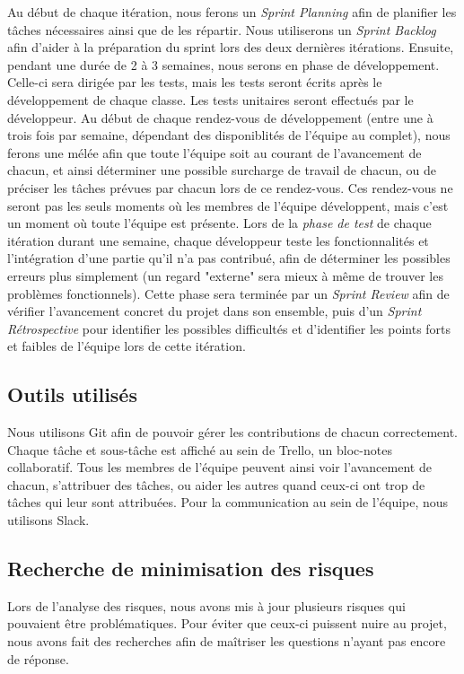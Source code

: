 \documentclass[hidelinks, 10pt,a4paper]{article}
\begin{document}
Au début de chaque itération, nous ferons un \emph{Sprint Planning} afin de planifier
les tâches nécessaires ainsi que de les répartir. Nous utiliserons un \emph{Sprint Backlog}
afin d'aider à la préparation du sprint lors des deux dernières itérations.
Ensuite, pendant une durée de 2 à 3 semaines, nous serons en phase de développement.
Celle-ci sera dirigée par les tests, mais les tests seront écrits après le développement
de chaque classe. Les tests unitaires seront effectués par le développeur.
Au début de chaque rendez-vous de développement (entre une à trois fois par semaine,
dépendant des disponiblités de l'équipe au complet), nous ferons une mélée afin que toute
l'équipe soit au courant de l'avancement de chacun, et ainsi déterminer une possible surcharge
de travail de chacun, ou de préciser les tâches prévues par chacun lors de ce rendez-vous.
Ces rendez-vous ne seront pas les seuls moments où les membres de l'équipe développent, mais
c'est un moment où toute l'équipe est présente.
Lors de la \emph{phase de test} de chaque itération durant une semaine, chaque développeur
teste les fonctionnalités et l'intégration d'une partie qu'il n'a pas contribué, afin de
déterminer les possibles erreurs plus simplement (un regard "externe" sera mieux à même
de trouver les problèmes fonctionnels). Cette phase sera terminée par un \emph{Sprint Review}
afin de vérifier l'avancement concret du projet dans son ensemble, puis d'un \emph{Sprint Rétrospective}
pour identifier les possibles difficultés et d'identifier les points forts et faibles de l'équipe
lors de cette itération.

\subsection{Outils utilisés}
Nous utilisons Git afin de pouvoir gérer les contributions de chacun correctement.
Chaque tâche et sous-tâche est affiché au sein de Trello, un bloc-notes collaboratif.
Tous les membres de l'équipe peuvent ainsi voir l'avancement de chacun, s'attribuer
des tâches, ou aider les autres quand ceux-ci ont trop de tâches qui leur sont
attribuées. Pour la communication au sein de l'équipe, nous utilisons Slack.

\subsection{Recherche de minimisation des risques}
Lors de l'analyse des risques, nous avons mis à jour plusieurs risques qui pouvaient
être problématiques. Pour éviter que ceux-ci puissent nuire au projet, nous avons
fait des recherches afin de maîtriser les questions n'ayant pas encore de réponse.
\end{document}
